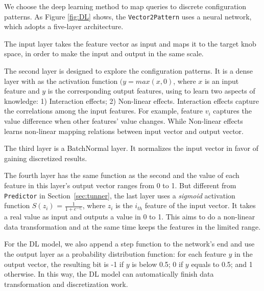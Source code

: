 \vspace{.25em} 
  We choose the deep learning method to map queries to discrete configuration patterns. As Figure \ref{fig:DL} shows, the \texttt{Vector2Pattern} uses a neural network, which adopts a five-layer architecture. 

The input layer takes the feature vector as input and maps it to the target knob space, in order to make the input and output in the same scale. 

The second layer is designed to explore the configuration patterns. It is a dense layer with  as the activation function %
$(y = max(x, 0)$, where $x$ is an input feature and $y$ is the corresponding output features, using to learn two aspects of knowledge: 1) Interaction effects; 2) Non-linear effects. Interaction effects capture the correlations among the input features. For example, feature $v_i$ captures the value difference when other features' value changes. While Non-linear effects learns non-linear mapping relations between input vector and output vector. 

The third layer is a BatchNormal layer. It normalizes the input vector in favor of gaining discretized results. 

The fourth layer has the same function as the second and the value of each feature in this layer's output vector ranges from 0 to 1. But different from \texttt{Predictor} in Section~\ref{sec:tunner}, the last layer uses a {\it sigmoid}  activation function $S(z_{i})$ = $\frac{1}{1+e^{-z_{i}}}$, where $z_i$ is the $i_{th}$ feature of the input vector. It takes a real value as input and outputs a value in 0 to 1. This aims to do a non-linear data transformation and  at the same time keeps the features in the limited range.  


For the DL model, we also append a step function to the network's end and use the output layer as a probability distribution function: for each feature $y$ in the output vector, the resulting bit is -1 if $y$ is below 0.5; 0 if $y$ equals to 0.5; and 1 otherwise. In this way, the DL model can automatically finish data transformation and discretization work. 

